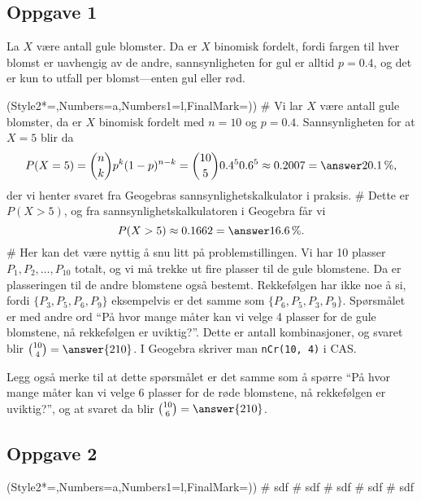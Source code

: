 \subsection*{Oppgave 1}
La $X$ være antall gule blomster.
Da er $X$ binomisk fordelt, fordi fargen til hver blomst er uavhengig av de andre, sannsynligheten for gul er alltid $p = 0.4$, og det er kun to utfall per blomst---enten gul eller rød.

\begin{easylist}[enumerate]
	\ListProperties(Style2*=,Numbers=a,Numbers1=l,FinalMark={)})
	# Vi lar $X$ være antall gule blomster, da er $X$ binomisk fordelt med $n=10$ og $p=0.4$. 
	Sannsynligheten for at $X=5$ blir da
	\begin{equation*}
		P(X = 5) = \binom{n}{k} p^k (1-p)^{n-k} = 
		\binom{10}{5} 0.4^5 0.6^{5} \approx 0.2007 = \answer{20.1 \, \%},
	\end{equation*}
	der vi henter svaret fra Geogebras sannsynlighetskalkulator i praksis.
	# Dette er $P(X > 5)$, og fra sannsynlighetskalkulatoren i Geogebra får vi
	\begin{equation*}
		P(X > 5) \approx 0.1662 = \answer{16.6 \, \%} .
	\end{equation*}
	# Her kan det være nyttig å snu litt på problemstillingen.
	Vi har 10 plasser $P_1, P_2, \dots, P_{10}$ totalt, og vi må trekke ut fire plasser til de gule blomstene.
	Da er plasseringen til de andre blomstene også bestemt.
	Rekkefølgen har ikke noe å si, fordi $\{ P_3, P_5, P_6, P_9 \}$ eksempelvis er det samme som $\{ P_6, P_5, P_3, P_9 \}$.
	Spørsmålet er med andre ord ``På hvor mange måter kan vi velge 4 plasser for de gule blomstene, nå rekkefølgen er uviktig?''.
	Dette er antall kombinasjoner, og svaret blir $\binom{10}{4} = \answer{210}$.
	I Geogebra skriver man \verb|nCr(10, 4)| i CAS.
	
	Legg også merke til at dette spørsmålet er det samme som å spørre ``På hvor mange måter kan vi velge 6 plasser for de røde blomstene, nå rekkefølgen er uviktig?'', og at svaret da blir $\binom{10}{6} = \answer{210}$.
\end{easylist}

\subsection*{Oppgave 2}
\begin{easylist}[enumerate]
	\ListProperties(Style2*=,Numbers=a,Numbers1=l,FinalMark={)})
	# sdf
	# sdf
	# sdf
	# sdf
	# sdf
\end{easylist}



